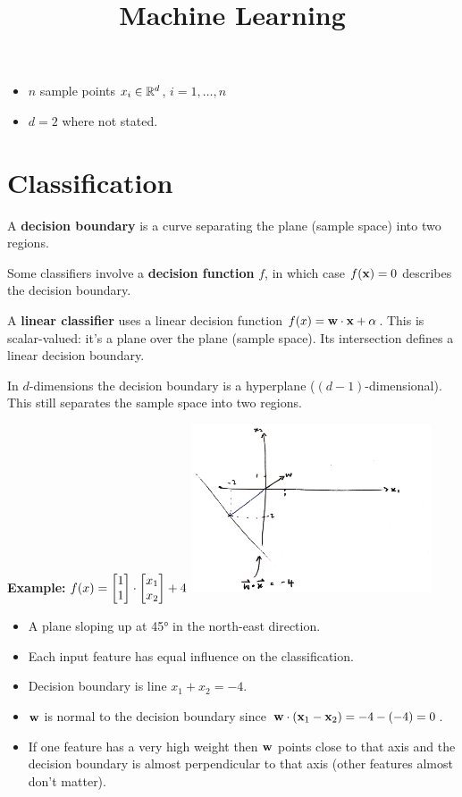 \documentclass[12pt]{article}
\title{Machine Learning}
\begin{document}
\maketitle

\begin{itemize}
\item $n$ sample points $x_i \in \mathbb{R}^d$, $i = 1, \ldots, n$
\item $d = 2$ where not stated.
\end{itemize}

\section*{Classification}

A \textbf{decision boundary} is a curve separating the plane (sample space)
into two regions.

Some classifiers involve a \textbf{decision function} $f$, in which case
$f(\mathbf x) = 0$ describes the decision boundary.

A \textbf{linear classifier} uses a linear decision function
$f(x) = \mathbf w \cdot \mathbf x + \alpha$. This is scalar-valued: it's a plane over
the plane (sample space). Its intersection defines a linear decision boundary.

In $d$-dimensions the decision boundary is a hyperplane
($(d-1)$-dimensional). This still separates the sample space into two regions.

\textbf{Example:} $f(x) = \begin{bmatrix}1\\1\end{bmatrix} \cdot \begin{bmatrix}x_1\\x_2\end{bmatrix} + 4$
\includegraphics[width=200pt]{img/machine-learning-linear-decision-boundary.png}
\begin{itemize}
\item A plane sloping up at 45° in the north-east direction.
\item Each input feature has equal influence on the classification.
\item Decision boundary is line $x_1 + x_2 = -4$.
\item $\mathbf w$ is normal to the decision boundary since $\mathbf w \cdot (\mathbf x_1 - \mathbf x_2) = -4 - (-4) = 0$.
\item If one feature has a very high weight then $\mathbf w$ points close to that
  axis and the decision boundary is almost perpendicular to that axis (other
  features almost don't matter).
\end{itemize}
\end{document}
